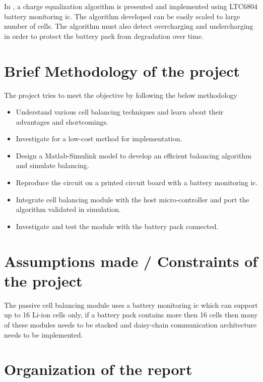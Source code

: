 In \cite{ls8}, a charge equalization algorithm is presented and implemented using LTC6804 battery monitoring \acrshort{ic}. The algorithm developed can be easily scaled to large number of cells. The algorithm must also detect overcharging and undercharging in order to protect the battery pack from degradation over time.  

\section[Brief Methodology of the project]{\textbf{Brief Methodology of the project}}
The project tries to meet the objective by following the below methodology
\begin{itemize}
\item Understand various cell balancing techniques and learn about their advantages and shortcomings.
\item Investigate for a low-cost method for implementation.
\item Design a Matlab-Simulink model to develop an efficient balancing algorithm and simulate balancing.
\item Reproduce the circuit on a printed circuit board with a battery monitoring \acrshort{ic}.
\item Integrate cell balancing module with the host micro-controller and port the algorithm validated in simulation.
\item Investigate and test the module with the battery pack connected.
\end{itemize}
\section[Assumptions made / Constraints of the project]{\textbf{Assumptions made / Constraints of the project}}
The passive cell balancing module uses a battery monitoring \acrshort{ic} which can support up to 16 Li-ion cells only, if a battery pack contains more then 16 cells then many of these modules needs to be stacked and daisy-chain communication architecture needs to be implemented.  

\section[Organization of the report]{\textbf{Organization of the report}}


